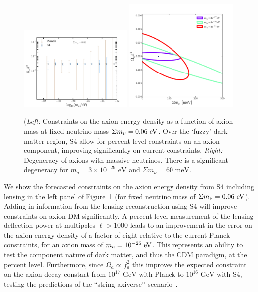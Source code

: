 \begin{figure}[t] 
\begin{center} 
\includegraphics[width=0.49\textwidth]{DarkEnergy/Log_constraints_axions_s4.pdf}
\includegraphics[width=0.49\textwidth]{DarkEnergy/s4_omnuh2_omaxh2_allmass.pdf}
\caption{(\textit{Left:} Constraints on the axion energy density as a function of axion mass at fixed neutrino mass $\Sigma m_\nu = 0.06~\rm{eV}$. Over the `fuzzy' dark matter region, S4 allow for percent-level constraints on an axion component, improving significantly on current constraints. \textit{Right:} Degeneracy of axions with massive neutrinos. There is a significant degeneracy for $m_a=3\times 10^{-29}\text{ eV}$ and $\Sigma m_\nu=60\text{ meV}$.
\label{fig:axions}}
\end{center}       
\end{figure}       

We show the forecasted constraints on the axion energy density from S4 including lensing in the left panel of Figure~\ref{fig:axions} (for fixed neutrino mass of $\Sigma m_\nu = 0.06~\rm{eV}$). Adding in information from the lensing reconstruction using S4 will improve constraints on axion DM significantly. A percent-level measurement of the lensing deflection power at multipoles $\ell > 1000$ leads to an improvement in the error on the axion energy density of a factor of eight relative to the current Planck constraints, for an axion mass of $m_a=10^{-26}~{\rm eV}$.    This represents an ability to test the component nature of dark matter, and thus the CDM paradigm, at the percent level. Furthermore, since $\Omega_a\propto f_a^2$ this improves the expected constraint on the axion decay constant from $10^{17}\text{ GeV}$ with Planck to $10^{16}\text{ GeV}$ with S4, testing the predictions of the ``string axiverse’’ scenario~\cite{axiverse}. 

